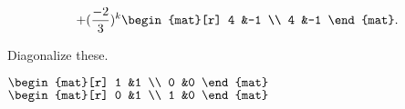 \begin{exercises}
\begin{answer}
\begin{equation*}
        +(\frac{-2}{3})^k
        \begin{mat}[r]
           4  &-1 \\
           4  &-1
        \end{mat}.
      \end{equation*}  
     \end{answer}
  \recommended \item \label{exer:DiagThese} 
    Diagonalize these.
    \begin{exparts*}
      \partsitem \( \begin{mat}[r]
                  1  &1  \\
                  0  &0
               \end{mat} \)
      \partsitem \( \begin{mat}[r]
                  0  &1  \\
                  1  &0
               \end{mat} \)
    \end{exparts*}
    \begin{answer}
\end{answer}
\end{exercises}
